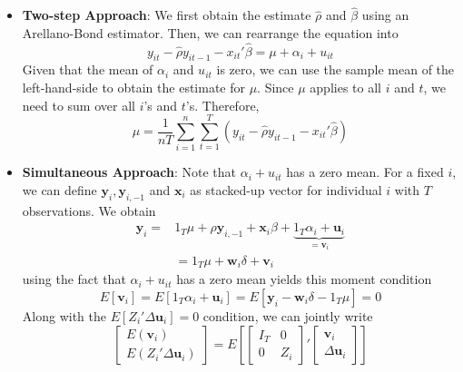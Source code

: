 \documentclass[12pt]{article}
\theoremstyle{definition}
\theoremstyle{property}
\theoremstyle{assumption}
\theoremstyle{example}
\theoremstyle{comment}
\begin{document}
\begin{itemize}
\item \textbf{Two-step Approach}: We first obtain the estimate $\hat{\rho}$ and $\hat{\beta}$ using an Arellano-Bond estimator. Then, we can rearrange the equation into
\[
y_{it}-\hat{\rho} y_{it-1}-x_{it}'\hat{\beta}=\mu+\alpha_i + u_{it}
\]
Given that the mean of $\alpha_i$ and $u_{it}$ is zero, we can use the sample mean of the left-hand-side to obtain the estimate for $\mu$. Since $\mu$ applies to all $i$ and $t$, we need to sum over all $i$'s and $t$'s. Therefore, 
\[
\hat{\mu}=\frac{1}{nT}\sum_{i=1}^n \sum_{t=1}^T\left(y_{it}-\hat{\rho} y_{it-1}-x_{it}'\hat{\beta}\right)
\]
\item \textbf{Simultaneous Approach}: Note that $\alpha_i + u_{it}$ has a zero mean. For a fixed $i$, we can define $\mathbf{y}_i, \mathbf{y}_{i,-1}$ and $\mathbf{x}_i$ as stacked-up vector for individual $i$ with $T$ observations. We obtain
\small{\begin{align*}
\mathbf{y}_i =& 1_T\mu+\rho\mathbf{y}_{i,-1}+\mathbf{x}_i\beta+\underbrace{1_T\alpha_i + \mathbf{u}_i}_{=\mathbf{v}_i}\\
&=1_T\mu+\mathbf{w}_i\delta+\mathbf{v}_i
\end{align*}}\normalsize
using the fact that $\alpha_i + u_{it}$ has a zero mean yields this moment condition
\[
E[\mathbf{v}_i]=E[1_T\alpha_i + \mathbf{u}_i]=E[\mathbf{y}_i-\mathbf{w}_i\delta-1_T\mu]=0
\]
Along with the $E[Z_i'\Delta \mathbf{u}_i]=0$ condition, we can jointly write
\[
\begin{bmatrix}E(\mathbf{v}_i) \\ E(Z_i'\Delta \mathbf{u}_i) \end{bmatrix}=E\left[\begin{bmatrix}I_T & 0 \\ 0 & Z_i\end{bmatrix}'\begin{bmatrix}\mathbf{v}_i \\ \Delta\mathbf{u}_i \end{bmatrix}\right]
\]
\end{itemize}
\end{document}

